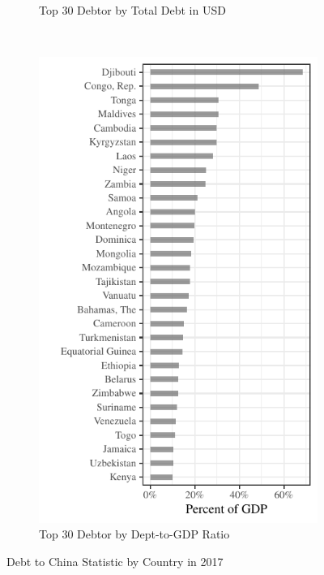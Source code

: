 \begin{figure}[t]
\begin{subfigure}[t]{0.45\textwidth}
        \caption{Top 30 Debtor by Total Debt in USD}
        \label{fig:total-debt-30}
    \end{subfigure}%
    ~
    \begin{subfigure}[t]{0.45\textwidth}
        \centering
        \includegraphics[width = \textwidth]{fig/perc_debt.pdf}
        \caption{Top 30 Debtor by Dept-to-GDP Ratio}
        \label{fig:perc-debt-30}
    \end{subfigure}
    \caption{Debt to China Statistic by Country in 2017}
    \label{fig:Country-Agg}
\end{figure}

